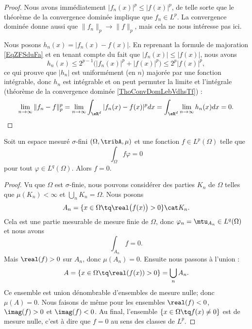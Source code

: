 \begin{proof}
    Nous avons immédiatement \( | f_n(x) |^p\leq | f(x) |^p\), de telle sorte que le théorème de la convergence dominée implique que \( f_n\in L^p\). La convergence dominée donne aussi que \( \| f_n \|_p\to\| f \|_p\), mais cela ne nous intéresse pas ici.

    Nous posons \( h_n(x)= | f_n(x)-f(x) | \). En reprenant la formule de majoration \eqref{EqZFSduFa} et en tenant compte du fait que \( | f_n(x) |\leq | f(x) |\), nous avons
   \begin{equation}
       h_n(x)\leq 2^{p-1}\big( | f_n(x) |^p+| f(x) |^p \big)\leq 2^p| f(x) |^p,
   \end{equation}
   ce qui prouve que \( | h_n |\) est uniformément (en \( n\)) majorée par une fonction intégrable, donc \( h_n\) est intégrable et on peut permuter la limite et l'intégrale (théorème de la convergence dominée \ref{ThoConvDomLebVdhsTf}) :
   \begin{equation}
       \lim_{n\to \infty} \| f_n-f \|^p_p=\lim_{n\to \infty} \int_{\eR^d}| f_n(x)-f(x) |^pdx=\int_{\eR^d}\lim_{n\to \infty} h_n(x)dx=0.
   \end{equation}
\end{proof}

\begin{proposition} \label{PropRERZooYcEchc}
    Soit un espace mesuré \( \sigma\)-fini \( (\Omega,\tribA,\mu)\) et une fonction \( f\in L^p(\Omega)\) telle que
    \begin{equation}
        \int_{\Omega}f\varphi=0
    \end{equation}
    pour tout \( \varphi\in L^q(\Omega)\). Alors \( f=0\).
\end{proposition}

\begin{proof}
    Vu que \( \Omega\) est \( \sigma\)-finie, nous pouvons considérer des parties \( K_n\) de \( \Omega\) telles que \( \mu(K_n)<\infty\) et \( \bigcup_nK_n=\Omega\). Nous posons
    \begin{equation}
        A_n=\{ x\in\Omega\tq  \real\big( f(x) \big)>0 \}\cat K_n.
    \end{equation}
    Cela est une partie mesurable de mesure finie de \( \Omega\), donc \( \varphi_n=\mtu_{A_n}\in L^q(\Omega)\) et nous avons
    \begin{equation}
        \int_{A_n}f=0.
    \end{equation}
    Mais \( \real(f)>0\) sur \( A_n\), donc \( \mu(A_n)=0\). Ensuite nous passons à l'union :
    \begin{equation}
        A=\{ x\in \Omega\tq \real(f(x))>0 \}=\bigcup_nA_n.
    \end{equation}
    Ce ensemble est union dénombrable d'ensembles de mesure nulle; donc \( \mu(A)=0\). Nous faisons de même pour les ensembles \( \real(f)<0\), \( \imag(f)>0\) et \( \imag(f)<0\). Au final, l'ensemble \( \{ x\in\Omega\tq f(x)\neq 0 \}\) est de mesure nulle, c'est à dire que \( f=0\) au sens des classes de \( L^p\).
\end{proof}

